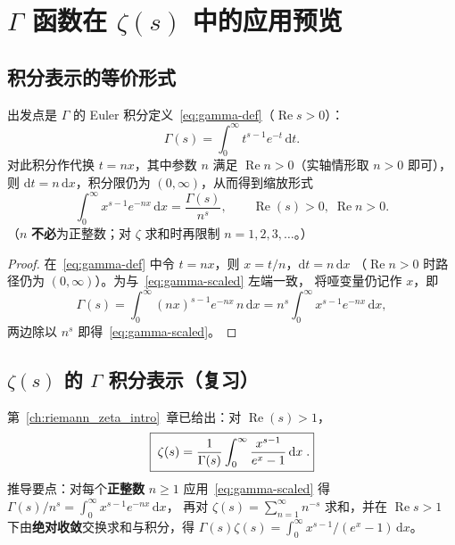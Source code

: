 \section{\texorpdfstring{$\Gamma$}{Gamma} 函数在 \texorpdfstring{$\zeta(s)$}{Zeta(s)} 中的应用预览}\label{sec:gamma_zeta_preview}

\subsection{积分表示的等价形式}

出发点是 $\Gamma$ 的 Euler 积分定义~\eqref{eq:gamma-def}（$\operatorname{Re}s>0$）：
\[
  \Gamma(s)
  = \int_0^\infty t^{s-1} e^{-t}\,\mathrm{d}t.
\]
对此积分作代换 $t=nx$，其中参数 $n$ 满足 $\operatorname{Re}n>0$（实轴情形取 $n>0$ 即可），
则 $\mathrm{d}t=n\,\mathrm{d}x$，积分限仍为 $(0,\infty)$，从而得到缩放形式
\begin{equation}
\int_0^\infty x^{s-1} e^{-nx} \,\mathrm{d}x = \frac{\Gamma(s)}{n^s},
\qquad \operatorname{Re}(s) > 0,\; \operatorname{Re}n > 0.
\label{eq:gamma-scaled}
\end{equation}
（$n$ \textbf{不必}为正整数；对 $\zeta$ 求和时再限制 $n=1,2,3,\ldots$。）

\begin{proof}
在~\eqref{eq:gamma-def} 中令 $t=nx$，则 $x=t/n$，$\mathrm{d}t=n\,\mathrm{d}x$
（$\operatorname{Re}n>0$ 时路径仍为 $(0,\infty)$）。为与~\eqref{eq:gamma-scaled} 左端一致，
将哑变量仍记作 $x$，即
\[
\Gamma(s)
= \int_0^\infty (nx)^{s-1} e^{-nx}\, n\,\mathrm{d}x
= n^{s}\int_0^\infty x^{s-1} e^{-nx}\,\mathrm{d}x,
\]
两边除以 $n^{s}$ 即得~\eqref{eq:gamma-scaled}。\qedhere
\end{proof}

\subsection{\texorpdfstring{$\zeta(s)$}{Zeta(s)} 的 \texorpdfstring{$\Gamma$}{Gamma} 积分表示（复习）}

第~\ref{ch:riemann_zeta_intro}~章已给出：对 $\operatorname{Re}(s) > 1$，
\begin{equation}
    \boxed{\;
    \zeta(s) = \frac{1}{\Gamma(s)} \int_0^\infty \frac{x^{s-1}}{e^x - 1} \,\mathrm{d}x
    \;\vphantom{\int_0^\infty}.
    }
    \label{eq:zeta-gamma-integral}
\end{equation}
推导要点：对每个\textbf{正整数} $n\ge 1$ 应用~\eqref{eq:gamma-scaled} 得
$\Gamma(s)/n^s=\int_0^\infty x^{s-1}e^{-nx}\,\mathrm{d}x$，
再对 $\zeta(s)=\sum_{n=1}^\infty n^{-s}$ 求和，并在 $\operatorname{Re}s>1$ 下由\textbf{绝对收敛}交换求和与积分，得
$\Gamma(s)\zeta(s)=\int_0^\infty x^{s-1}/(e^x-1)\,\mathrm{d}x$。

